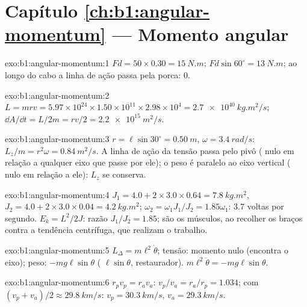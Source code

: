 \section*{Capítulo \ref{ch:b1:angular-momentum} --- Momento angular}

\begin{solution}{exo:b1:angular-momentum:1}
$Fd = 50 \times 0.30 = \qty{15}{N.m}$; $Fd\sin 60^\circ = \qty{13}{N.m}$;
ao longo do cabo a linha de ação passa pela porca: $0$.
\end{solution}

\begin{solution}{exo:b1:angular-momentum:2}
$L = mrv = 5.97\times10^{24} \times 1.50\times10^{11} \times 2.98\times10^4 =
\qty{2.7e40}{kg.m^2/s}$; $\dd A/\dd t = L/2m = rv/2 = \qty{2.2e15}{m^2/s}$.
\end{solution}

\begin{solution}{exo:b1:angular-momentum:3}
$r = \ell\sin 30^\circ = \qty{0.50}{m}$, $\omega = \qty{3.4}{rad/s}$:
$L_z/m = r^2\omega = \qty{0.84}{m^2/s}$. A linha de ação da tensão
passa pelo pivô ( nulo em relação a qualquer eixo que passe por ele); o
peso é paralelo ao eixo vertical ( nulo em relação a ele): $L_z$
se conserva.
\end{solution}

\begin{solution}{exo:b1:angular-momentum:4}
$J_1 = 4.0 + 2 \times 3.0 \times 0.64 = \qty{7.8}{kg.m^2}$, $J_2 = 4.0 +
2 \times 3.0 \times 0.04 = \qty{4.2}{kg.m^2}$; $\omega_2 = \omega_1J_1/J_2 =
1.85\omega_1$: \qty{3.7}{} voltas por segundo. $E_k = L^2/2J$: razão
$J_1/J_2 = 1.85$; são os músculos, ao recolher os braços contra a
tendência centrífuga, que realizam o trabalho.
\end{solution}

\begin{solution}{exo:b1:angular-momentum:5}
$L_\Delta = m\ell^2\dot\theta$; tensão: momento nulo (encontra o eixo);
peso: $-mg\ell\sin\theta$ ( $\ell\sin\theta$, restaurador).
$m\ell^2\ddot\theta = -mg\ell\sin\theta$.
\end{solution}

\begin{solution}{exo:b1:angular-momentum:6}
$r_pv_p = r_av_a$: $v_p/v_a = r_a/r_p = 1.034$; com $(v_p + v_a)/2 \approx
\qty{29.8}{km/s}$: $v_p = \qty{30.3}{km/s}$, $v_a = \qty{29.3}{km/s}$.
\end{solution}

